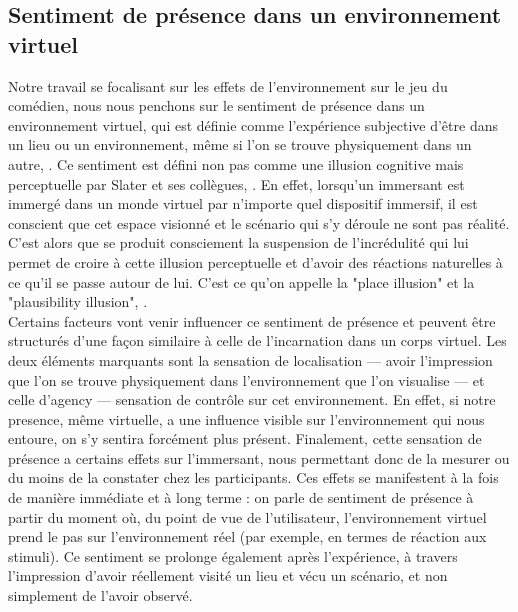 \subsection{Sentiment de présence dans un environnement virtuel}
Notre travail se focalisant sur les effets de l'environnement sur le jeu du comédien, nous nous penchons sur le 
sentiment de présence dans un environnement virtuel, qui est définie comme l'expérience subjective d'être dans un lieu ou un environnement, 
même si l’on se trouve physiquement dans un autre, \cite{WitmerSinger1998PresenceQuestionnaire}.
Ce sentiment est défini non pas comme une illusion cognitive mais perceptuelle par 
Slater et ses collègues, \cite{Slater2018Immersion}. En effet, lorsqu'un immersant est immergé dans un monde virtuel
par n'importe quel dispositif immersif, il est conscient que cet espace visionné et le scénario qui s'y 
déroule ne sont pas réalité. C'est alors 
que se produit consciement la suspension de l'incrédulité qui lui permet de croire à cette illusion perceptuelle
et d'avoir des réactions naturelles à ce qu'il se passe autour de lui. C'est ce qu'on 
appelle la "place illusion" et la "plausibility illusion", \cite{Slater2009PlaceIllusion}. \\
Certains facteurs vont venir influencer ce sentiment de présence et peuvent être structurés d'une façon similaire à celle
de l'incarnation dans un corps virtuel. Les deux éléments marquants sont la sensation de localisation --- avoir l’impression que l’on
se trouve physiquement dans l’environnement que l’on visualise --- et celle d’agency --- sensation de contrôle
sur cet environnement. En effet, si notre presence, même virtuelle, a une influence visible sur l’environnement qui nous entoure,
on s’y sentira forcément plus présent. 
Finalement, cette sensation de présence a certains effets sur l'immersant, nous permettant donc de la mesurer ou du 
moins de la constater chez les participants. Ces effets se manifestent à la fois de manière immédiate et à long terme : on parle 
de sentiment de présence à partir du moment où, du point de vue de l’utilisateur, l’environnement virtuel prend le pas sur l’environnement réel
 (par exemple, en termes de réaction aux stimuli). Ce sentiment se prolonge également après l’expérience, à travers l’impression
  d’avoir réellement visité un lieu et vécu un scénario, et non simplement de l’avoir observé.


